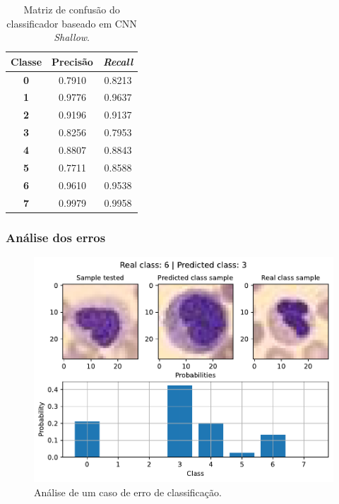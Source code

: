 \begin{table}[H]
	\centering
	\begin{tabular}{c|c|c}
		\textbf{Classe} & \textbf{Precisão} & \textit{\textbf{Recall}} \\ \hline
		\textbf{0}      & 0.7910            & 0.8213                   \\
		\textbf{1}      & 0.9776            & 0.9637                   \\
		\textbf{2}      & 0.9196            & 0.9137                   \\
		\textbf{3}      & 0.8256            & 0.7953                   \\
		\textbf{4}      & 0.8807            & 0.8843                   \\
		\textbf{5}      & 0.7711            & 0.8588                   \\
		\textbf{6}      & 0.9610            & 0.9538                   \\
		\textbf{7}      & 0.9979            & 0.9958                  
	\end{tabular}
	\caption{Matriz de confusão do classificador baseado em CNN \textit{Shallow}.}
	\label{tab:pr_CNN_shallow}
\end{table}

\subsubsection{Análise dos erros}



\begin{figure}[H]
	\centering
	\includegraphics[width=0.75\linewidth]{../../plot/cnn_shallow/error_analyser_35}
	\caption{Análise de um caso de erro de classificação.}
	\label{fig:error_analyser_35}
\end{figure}

